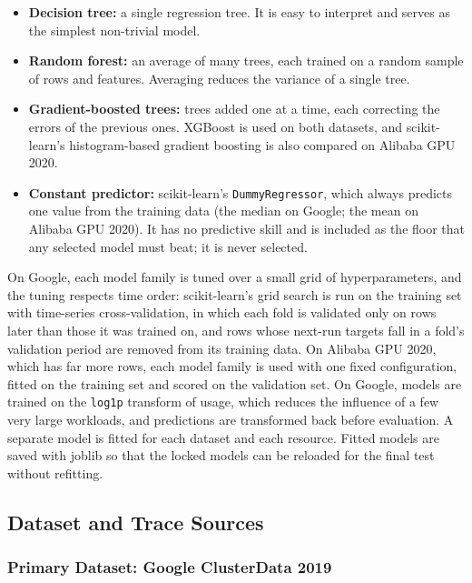 \begin{itemize}
\tightlist
\item
  \textbf{Decision tree:} a single regression tree. It is easy to interpret and serves as the simplest non-trivial model.
\item
  \textbf{Random forest:} an average of many trees, each trained on a random sample of rows and features. Averaging reduces the variance of a single tree.
\item
  \textbf{Gradient-boosted trees:} trees added one at a time, each correcting the errors of the previous ones. XGBoost is used on both datasets, and scikit-learn's histogram-based gradient boosting is also compared on Alibaba GPU 2020.
\item
  \textbf{Constant predictor:} scikit-learn's \texttt{DummyRegressor}, which always predicts one value from the training data (the median on Google; the mean on Alibaba GPU 2020). It has no predictive skill and is included as the floor that any selected model must beat; it is never selected.
\end{itemize}

On Google, each model family is tuned over a small grid of hyperparameters, and the tuning respects time order: scikit-learn's grid search is run on the training set with time-series cross-validation, in which each fold is validated only on rows later than those it was trained on, and rows whose next-run targets fall in a fold's validation period are removed from its training data. On Alibaba GPU 2020, which has far more rows, each model family is used with one fixed configuration, fitted on the training set and scored on the validation set. On Google, models are trained on the \texttt{log1p} transform of usage, which reduces the influence of a few very large workloads, and predictions are transformed back before evaluation. A separate model is fitted for each dataset and each resource. Fitted models are saved with joblib so that the locked models can be reloaded for the final test without refitting.

\subsection{Dataset and Trace Sources}\label{sec:3.3}

\subsubsection{Primary Dataset: Google ClusterData 2019}\label{sec:3.3.1}

